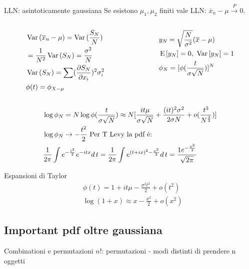 \begin{frame}{LLN: asintoticamente gaussiana}
Se esistono $\mu_1, \mu_2$ finiti vale LLN: $\overline{x}_n-\mu\xrightarrow{P}0$.
\begin{columns}[T]
\begin{column}{0.5\textwidth}
\begin{align*}
&\var{(\overline{x}_n-\mu)}=\var{(\frac{S_N}{N})}\\
&=\frac{1}{N^2}\var{(S_N)}=\frac{\sigma^2}{N}\\
&\var{(S_N)}=\sum(\PDy{x_i}{S_N})^2\sigma_i^2\\
&\phi(t)=\phi_{X-\mu}
\end{align*}
\end{column}
\begin{column}{0.5\textwidth}
\begin{align*}
&y_N=\sqrt{\frac{N}{\sigma^2}}(\overline{x}-\mu)\\
&\E{[y_N]}=0,\ \var{[y_N]}=1\\
&\phi_N=[\phi(\frac{t}{\sigma\sqrt{N}})]^N
\end{align*}
\end{column}
\end{columns}
\begin{align*}
&\log{\phi_N}=N\log{\phi(\frac{t}{\sigma\sqrt{N}})}\approx N[\frac{it\mu}{\sigma\sqrt{N}}+\frac{(it)^2\sigma^2}{2\sigma N}+o(\frac{t^3}{N\expy{\frac{3}{2}}})]\\
&\log{\phi_N}\to-\frac{t^2}{2}\ \text{Per T Levy la pdf \'e:}\\
&\frac{1}{2\pi}\int\exp{-\frac{t^2}{2}}\exp{-itx}d\,t=\frac{1}{2\pi}\int\exp{(t+ix)^2-\frac{x^2}{2}}d\,t=\frac{1\exp{-\frac{x^2}{2}}}{\sqrt{2\pi}}
\end{align*}
\end{frame}

\begin{wordonframe}{Espansioni di Taylor}
\begin{align*}
&\phi(t)=1+it\mu-\frac{\sigma^2t^2}{2}+o(t^2)\\
&\log{(1+x)}\approx x-\frac{x^2}{2}+o(x^2)
\end{align*}
\end{wordonframe}

\subsection{Important pdf oltre gaussiana}

\begin{frame}{Combinationi e permutazioni}
$n!$: permutazioni - modi distinti di prendere n oggetti
\end{frame}

